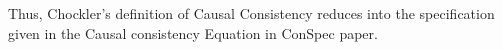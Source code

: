 \documentclass[journal,compsoc]{IEEEtran}
\begin{document}
 Thus, Chockler's definition of Causal Consistency reduces into the specification given in the Causal consistency Equation in ConSpec paper. %
\end{document}
